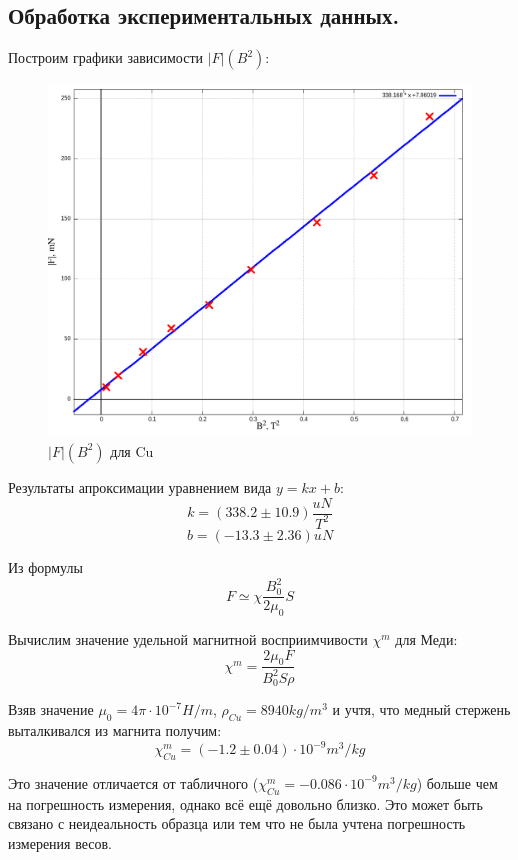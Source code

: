 \documentclass{article}
\begin{document}
    \subsection{Обработка экспериментальных данных.}

    Построим графики зависимости $|F|(B^2)$:

    \begin{figure}[H]
        \centering
        \includegraphics[width=\textwidth]{Cu-comp.png}
        \caption{$|F|(B^2)$ для Cu}
    \end{figure}

    Результаты апроксимации уравнением вида \(y = kx + b\):
    \[ k = (338.2 \pm 10.9) \frac{uN}{T^2} \]
    \[ b = (-13.3 \pm 2.36) uN \]

    Из формулы
    \[ F \simeq \chi\frac{B_0^2}{2\mu_0}S \]

    Вычислим значение удельной магнитной восприимчивости \(\chi^m\) для Меди:
    \[ \chi^m = \frac{2\mu_0F}{B_0^2S\rho} \]

    Взяв значение \( \mu_0 = 4\pi \cdot 10^{-7} H/m \), \( \rho_{Cu} = 8940 kg/m^3 \) и учтя, что медный стержень
    выталкивался из магнита получим:
    \[ \chi^{m}_{Cu} = (-1.2 \pm 0.04) \cdot 10^{-9} m^3/kg \]

    Это значение отличается от табличного (\( \chi^m_{Cu} = -0.086 \cdot 10^{-9} m^3/kg \)) больше чем на погрешность
    измерения, однако всё ещё довольно близко. Это может быть связано с неидеальность образца или тем что не была учтена
    погрешность измерения весов.
\end{document}
